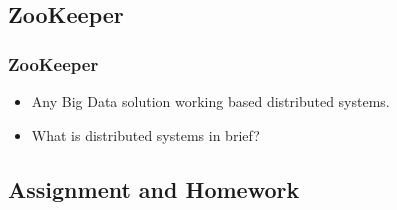 
\subsection{ZooKeeper}
\begin{frame}
\frametitle{ZooKeeper}
\begin{itemize}[<+->]
	\item Any Big Data solution working based distributed systems.
	\item What is distributed systems in brief?
\end{itemize}
\end{frame}

\subsection{Assignment and Homework}



